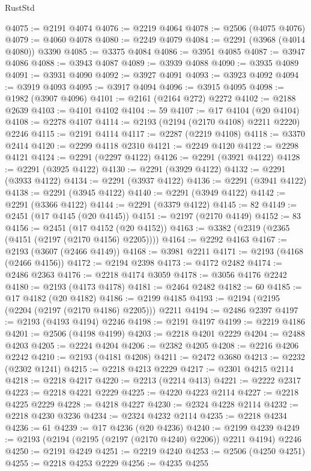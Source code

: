 \begin{lexlean}{RustStd}
\begin{coremodule}
{\begin{coremodule}
{{{{{{{{{{{{{{{{{{{{{{{{{{@4075 := @2191 @4074
@4076 := @2219 @4064
@4078 := @2506 (@4075 @4076)
@4079 := @4060 @4078
@4080 := @2249 @4079
@4084 := @2291 (@3968 (@4014 @4080)) @3390
@4085 := @3375 @4084
@4086 := @3951 @4085
@4087 := @3947 @4086
@4088 := @3943 @4087
@4089 := @3939 @4088
@4090 := @3935 @4089
@4091 := @3931 @4090
@4092 := @3927 @4091
@4093 := @3923 @4092
@4094 := @3919 @4093
@4095 := @3917 @4094
@4096 := @3915 @4095
@4098 := @1982 (@3907 @4096)
@4101 := @2161 (@2164 @272) @2272
@4102 := @2188 @2639
@4103 := @4101 @4102
@4104 := 59
@4107 := @17 @4104 (@20 @4104)
@4108 := @2278 @4107
@4114 := @2193 (@2194 (@2170 @4108) @2211 @2220) @2246
@4115 := @2191 @4114
@4117 := @2287 (@2219 @4108)
@4118 := @3370 @2414
@4120 := @2299 @4118 @2310
@4121 := @2249 @4120
@4122 := @2298 @4121
@4124 := @2291 (@2297 @4122)
@4126 := @2291 (@3921 @4122)
@4128 := @2291 (@3925 @4122)
@4130 := @2291 (@3929 @4122)
@4132 := @2291 (@3933 @4122)
@4134 := @2291 (@3937 @4122)
@4136 := @2291 (@3941 @4122)
@4138 := @2291 (@3945 @4122)
@4140 := @2291 (@3949 @4122)
@4142 := @2291 (@3366 @4122)
@4144 := @2291 (@3379 @4122)
@4145 := 82
@4149 := @2451 (@17 @4145 (@20 @4145))
@4151 := @2197 (@2170 @4149)
@4152 := 83
@4156 := @2451 (@17 @4152 (@20 @4152))
@4163 := @3382 (@2319 (@2365 (@4151 (@2197 (@2170 @4156) @2205))))
@4164 := @2292 @4163
@4167 := @2193 (@3607 (@2466 @4149))
@4168 := @3981 @2211
@4171 := @2193 (@4168 (@2466 @4156))
@4172 := @2194 @2398
@4173 := @4172 @2482
@4174 := @2486 @2363
@4176 := @2218 @4174 @3059
@4178 := @3056 @4176 @2242
@4180 := @2193 (@4173 @4178)
@4181 := @2464 @2482
@4182 := 60
@4185 := @17 @4182 (@20 @4182)
@4186 := @2199 @4185
@4193 := @2194 (@2195 (@2204 (@2197 (@2170 @4186) @2205))) @2211
@4194 := @2486 @2397
@4197 := @2193 (@4193 @4194) @2246
@4198 := @2191 @4197
@4199 := @2219 @4186
@4201 := @2506 (@4198 @4199)
@4203 := @2218 @4201 @2229
@4204 := @2488 @4203
@4205 := @2224 @4204
@4206 := @2382 @4205
@4208 := @2216 @4206 @2242
@4210 := @2193 (@4181 @4208)
@4211 := @2472 @3680
@4213 := @2232 (@2302 @1241)
@4215 := @2218 @4213 @2229
@4217 := @2301 @4215 @2114
@4218 := @2218 @4217
@4220 := @2213 (@2214 @413)
@4221 := @2222 @2317
@4223 := @2218 @4221 @2229
@4225 := @4220 @4223 @2114
@4227 := @2218 @4225 @2229
@4228 := @4218 @4227
@4230 := @2324 @4228 @2114
@4232 := @2218 @4230 @3236
@4234 := @2324 @4232 @2114
@4235 := @2218 @4234
@4236 := 61
@4239 := @17 @4236 (@20 @4236)
@4240 := @2199 @4239
@4249 := @2193 (@2194 (@2195 (@2197 (@2170 @4240) @2206)) @2211 @4194) @2246
@4250 := @2191 @4249
@4251 := @2219 @4240
@4253 := @2506 (@4250 @4251)
@4255 := @2218 @4253 @2229
@4256 := @4235 @4255
}}}}}}}}}}}}}}}}}}}}}}}}}}
\end{coremodule}}
\end{coremodule}
\end{lexlean}
